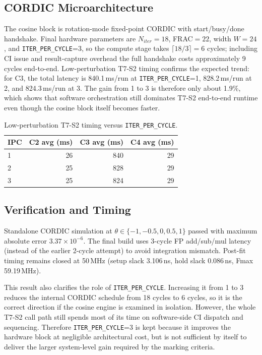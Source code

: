 \documentclass[a4paper,10pt,twocolumn]{article}
\begin{document}
\subsection{CORDIC Microarchitecture}
The cosine block is rotation-mode fixed-point CORDIC with start/busy/done handshake. Final hardware parameters are $N_{iter}=18$, FRAC$=22$, width $W=24$, and \texttt{ITER\_PER\_CYCLE}=3, so the compute stage takes $\lceil18/3\rceil=6$ cycles; including CI issue and result-capture overhead the full handshake costs approximately 9 cycles end-to-end. Low-perturbation T7-S2 timing confirms the expected trend: for C3, the total latency is 840.1\,ms/run at \texttt{ITER\_PER\_CYCLE}=1, 828.2\,ms/run at 2, and 824.3\,ms/run at 3. The gain from 1 to 3 is therefore only about 1.9\%, which shows that software orchestration still dominates T7-S2 end-to-end runtime even though the cosine block itself becomes faster.

\begin{table}[t]
\centering
\caption{Low-perturbation T7-S2 timing versus \texttt{ITER\_PER\_CYCLE}.}
\label{tab:t7b_ipc_lp}
\footnotesize
\setlength{\tabcolsep}{3.5pt}
\begin{tabular}{lrrr}
\toprule
IPC & C2 avg (ms) & C3 avg (ms) & C4 avg (ms) \\
\midrule
1 & 26 & 840 & 29 \\
2 & 25 & 828 & 29 \\
3 & 25 & 824 & 29 \\
\bottomrule
\end{tabular}
\end{table}

\subsection{Verification and Timing}
Standalone CORDIC simulation at $\theta\in\{-1,-0.5,0,0.5,1\}$ passed with maximum absolute error $3.37\times10^{-6}$. The final build uses 3-cycle FP add/sub/mul latency (instead of the earlier 2-cycle attempt) to avoid integration mismatch. Post-fit timing remains closed at 50\,MHz (setup slack 3.106\,ns, hold slack 0.086\,ns, Fmax 59.19\,MHz).

This result also clarifies the role of \texttt{ITER\_PER\_CYCLE}. Increasing it from 1 to 3 reduces the internal CORDIC schedule from 18 cycles to 6 cycles, so it is the correct direction if the cosine engine is examined in isolation. However, the whole T7-S2 call path still spends most of its time on software-side CI dispatch and sequencing. Therefore \texttt{ITER\_PER\_CYCLE}=3 is kept because it improves the hardware block at negligible architectural cost, but is not sufficient by itself to deliver the larger system-level gain required by the marking criteria.
\end{document}
